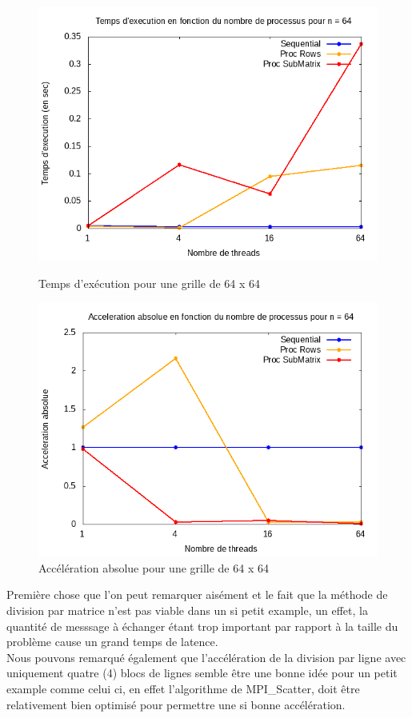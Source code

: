 \documentclass[10pt,a4paper]{article}
\begin{document}
\newpage
\begin{figure}[!]
  \centering
  \begin{minipage}[b]{0.49\textwidth}
	\includegraphics[width=\textwidth]{./Time/size_64_time.png}
    \caption{Temps d'exécution pour une grille de 64 x 64}
  \end{minipage}
  \hfill
  \begin{minipage}[b]{0.49\textwidth}
    \includegraphics[width=\textwidth]{./Time/size_64_acceleration.png}
    \caption{Accélération absolue pour une grille de 64 x 64}
  \end{minipage}
\end{figure}

Première chose que l'on peut remarquer aisément et le fait que la méthode de division par matrice n'est pas viable dans un si petit example, un effet, la quantité de messsage à échanger étant trop important par rapport à la taille du problème cause un grand temps de latence.\\
Nous pouvons remarqué également que l'accélération de la division par ligne avec uniquement quatre (4) blocs de lignes semble être une bonne idée pour un petit example comme celui ci, en effet l'algorithme de MPI\_Scatter, doit être relativement bien optimisé pour permettre une si bonne accélération.
\end{document}
